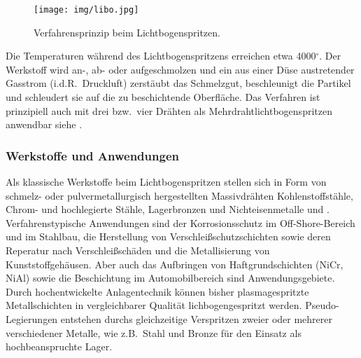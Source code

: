 \documentclass[12pt,a4paper,bibliography=totocnumbered,listof=totocnumbered,fleqn]{scrartcl}
\begin{document}
\pagebreak

\begin{figure}[h]
\centering
\texttt{[image: img/libo.jpg]}
\caption{Verfahrensprinzip beim Lichtbogenspritzen.}
\label{fig:libo}
\end{figure}

Die Temperaturen während des Lichtbogenspritzens erreichen etwa 4000$^\circ$. Der Werkstoff wird an-, ab- oder aufgeschmolzen und ein aus einer Düse austretender Gasstrom (i.d.R.\ Druckluft) zerstäubt das Schmelzgut, beschleunigt die Partikel und schleudert sie auf die zu beschichtende Oberfläche. Das Verfahren ist prinzipiell auch mit drei bzw.\ vier Drähten als Mehrdrahtlichtbogenspritzen anwendbar siehe \citep{bach2005moderne}.

\subsubsection{Werkstoffe und Anwendungen}

Als klassische Werkstoffe beim Lichtbogenspritzen stellen sich in Form von schmelz- oder pulvermetallurgisch hergestellten Massivdrähten Kohlenstoffstähle, Chrom- und hochlegierte Stähle, Lagerbronzen und Nichteisenmetalle \citep{bach2005moderne} und \citep{bobzin2013oberflchentechnik}.
Verfahrenstypische Anwendungen sind der Korrosionsschutz im Off-Shore-Bereich und im Stahlbau, die Herstellung von Verschleißschutzschichten sowie deren Reperatur nach Verschleißschäden und die Metallisierung von Kunststoffgehäusen.
Aber auch das Aufbringen von Haftgrundschichten (NiCr, NiAl) sowie die Beschichtung im Automobilbereich sind Anwendungsgebiete.
Durch hochentwickelte Anlagentechnik können bisher plasmagespritzte Metallschichten in vergleichbarer Qualität lichbogengespritzt werden.
Pseudo-Legierungen entstehen durchs gleichzeitige Verspritzen zweier oder mehrerer verschiedener Metalle, wie z.B.\ Stahl und Bronze für den Einsatz als hochbeanspruchte Lager.

\pagebreak
\end{document}
